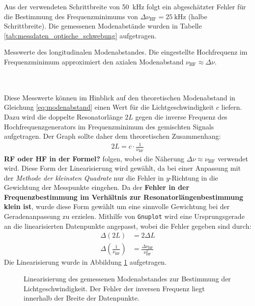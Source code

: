 \documentclass[11pt, a4paper]{article}
\numberwithin{equation}{section}
\begin{document}
Aus der verwendeten Schrittbreite von \SI{50}{\kilo\hertz} folgt ein abgeschätzter Fehler für die Bestimmung des Frequenzminimums von $\Delta \nu_\mathrm{HF} = \SI{25}{\kilo\hertz}$ (halbe Schrittbreite).
Die gemessenen Modenabstände wurden in Tabelle \ref{tab:messdaten_optische_schwebung} aufgetragen.
\begin{table}[h]
	\centering
	
	\caption{Messwerte des longitudinalen Modenabstandes. Die eingestellte Hochfrequenz im Frequenzminimum approximiert den axialen Modenabstand $\nu_\mathrm{HF} \approx \Delta \nu$.}
	\label{tab:messdaten_optische_schwebung}
\end{table}\\
\\
Diese Messwerte können im Hinblick auf den theoretischen Modenabstand in Gleichung \eqref{eq:modenabstand} einen Wert für die Lichtgeschwindigkeit $c$ liefern.
Dazu wird die doppelte Resonatorlänge $2 L$ gegen die inverse Frequenz des Hochfrequenzgenerators im Frequenzminimum des gemischten Signals aufgetragen.
Der Graph sollte daher dem theoretischen Zusammenhang:
\begin{align}
	2 L = c \cdot \frac{1}{\nu_\mathrm{RF}}
\end{align}
\textbf{RF oder HF in der Formel?}
folgen, wobei die Näherung $\Delta \nu \approx \nu_\mathrm{HF}$ verwendet wird.
Diese Form der Linearisierung wird gewählt, da bei einer Anpassung mit der \emph{Methode der kleinsten Quadrate} nur die Fehler in $y$-Richtung in die Gewichtung der Messpunkte eingehen.
Da der \textbf{Fehler in der Frequenzbestimmung im Verhältnis zur Resonatorlängenbestimmung klein ist}, wurde diese Form gewählt um eine sinnvolle Gewichtung bei der Geradenanpassung zu erzielen.
Mithilfe von \texttt{Gnuplot} wird eine Ursprungsgerade an die linearisierten Datenpunkte angepasst, wobei die Fehler gegeben sind durch:
\begin{align}
\Delta(2L) &= 2 \Delta L \\
\Delta \left( \frac{1}{\nu_\mathrm{HF}} \right) &= \frac{\Delta \nu_\mathrm{HF}}{\nu_\mathrm{HF}^2}
\end{align}
Die Linearisierung wurde in Abbildung \ref{fig:linearisierung_modenabstand} aufgetragen.
\begin{figure}[h]
	\centering
	
	\caption{Linearisierung des gemessenen Modenabstandes zur Bestimmung der Lichtgeschwindigkeit. Der Fehler der inversen Frequenz liegt innerhalb der Breite der Datenpunkte.}
	\label{fig:linearisierung_modenabstand}
\end{figure}
\end{document}
